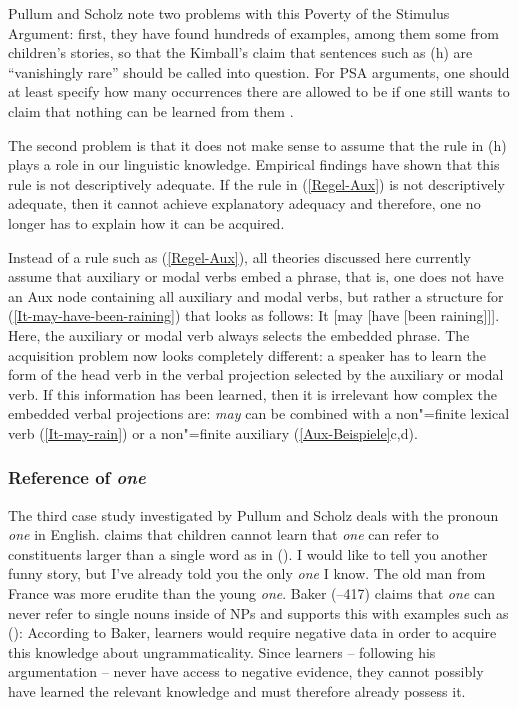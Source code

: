 Pullum and Scholz note two problems with this Poverty of the Stimulus Argument: first, they have found hundreds of examples, among them some from
children's stories, so that the Kimball's claim that sentences such as (h) are ``vanishingly rare'' should
be called into question. For PSA arguments, one should at least specify how many occurrences there are allowed to be if one still wants to claim
that nothing can be learned from them \citep[]{PS2002a}. 

The second problem is that it does not make sense to assume that the rule in  (h) plays a role in our linguistic knowledge.
Empirical findings have shown that this rule is not descriptively adequate. If the rule in (\ref{Regel-Aux}) is not descriptively
adequate, then it cannot achieve explanatory adequacy and therefore, one no longer has to explain how it can be acquired.
  
Instead of a rule such as (\ref{Regel-Aux}), all theories discussed here currently assume that auxiliary or modal verbs embed a phrase, that is,
one does not have an Aux node containing all auxiliary and modal verbs, but rather a structure for (\ref{It-may-have-been-raining}) that looks
as follows:
\ea
It [may [have [been raining]]].
\z
Here, the auxiliary or modal verb always selects the embedded phrase. The acquisition problem now looks completely different: a speaker has to learn the form
of the head verb in the verbal projection selected by the auxiliary or modal verb. If this information has been learned, then it is irrelevant
how complex the embedded verbal projections are: \emph{may} can be combined with a non"=finite lexical verb (\ref{It-may-rain}) or a non"=finite
auxiliary (\ref{Aux-Beispiele}c,d).

\subsubsection{Reference of \emph{one}}

The third case study investigated by Pullum and Scholz deals with the pronoun \emph{one} in English.
\citet[--425, 327--340]{Baker78a-u} claims that children cannot learn that \emph{one} can refer to constituents
larger than a single word as in ().
\eal
\ex I would like to tell you another funny story, but I've already told you the only \emph{one} I
know.
\ex The old man from France was more erudite than the young \emph{one}.
\zl
Baker (--417) claims that \emph{one} can never refer to single nouns inside of NPs and supports this
with examples such as ():
\z
According to Baker, learners would require negative data in order to acquire this knowledge about ungrammaticality.
Since learners -- following his argumentation -- never have access to negative evidence, they cannot possibly have learned the relevant
knowledge and must therefore already possess it.

